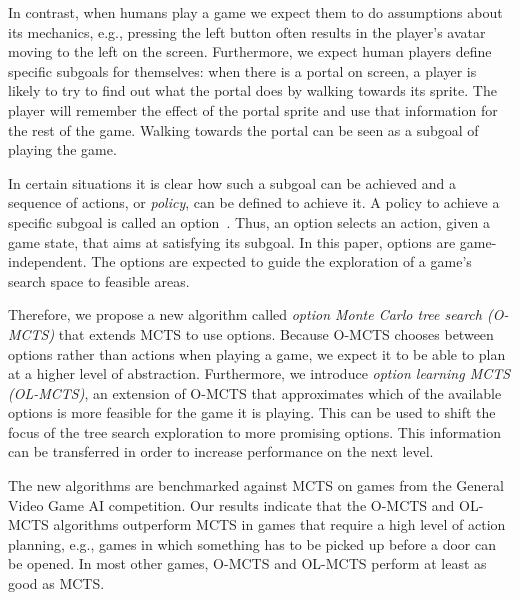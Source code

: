 In contrast, when humans play a game we expect them to do assumptions about its
mechanics, e.g., pressing the left button often results in the player's avatar
moving to the left on the screen. 
Furthermore, we expect human players define specific subgoals for themselves:
when there is a portal on screen, a player is likely to try to find out what the
portal does by walking towards its sprite. The player will remember the effect
of the portal sprite and use that information for the rest of the game. Walking
towards the portal can be seen as a subgoal of playing the game.

In certain situations it is clear how such a subgoal can be achieved and a
sequence of actions, or \emph{policy}, can be defined to achieve it. A policy to
achieve a specific subgoal is called an option~\cite{sutton1999between}. Thus,
an option selects an action, given a game state, that aims at satisfying its
subgoal. In this paper, options are game-independent. The options are expected
to guide the exploration of a game's search space to feasible areas.


Therefore, we propose a new algorithm called \emph{option Monte Carlo tree
search (O-MCTS)} that extends MCTS to use options. Because O-MCTS chooses
between options rather than actions when playing a game, we expect it to be able
to plan at a higher level of abstraction. Furthermore, we introduce \emph{option
learning MCTS (OL-MCTS)}, an extension of O-MCTS that approximates which of the
available options is more feasible for the game it is playing. This can
be used to shift the focus of the tree search exploration to more promising
options. This information can be transferred in order to increase performance on
the next level.

The new algorithms are benchmarked against MCTS on games from the General Video
Game AI competition. Our results indicate that the O-MCTS and OL-MCTS algorithms
outperform MCTS in games that require a high level of action planning, e.g.,
games in which something has to be picked up before a door can be opened. In
most other games, O-MCTS and OL-MCTS perform at least as good as MCTS\@.
